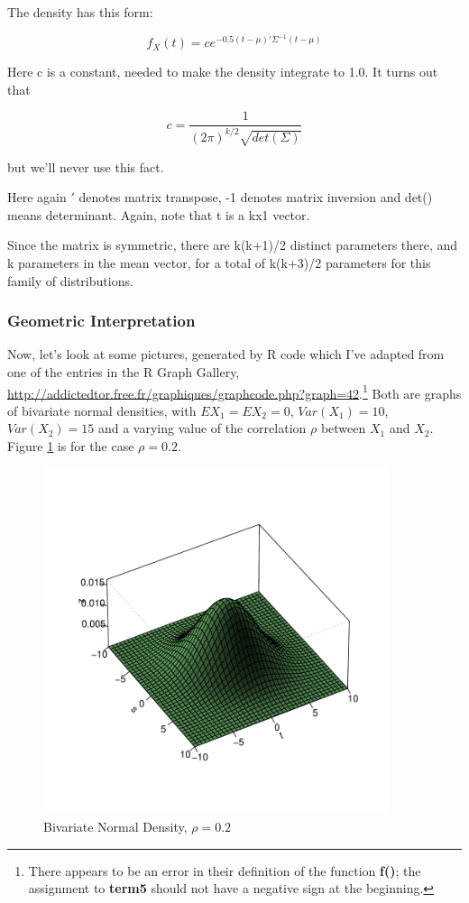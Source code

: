 The density has this form:

\begin{equation}
\label{bigbell}
f_X(t) = c e^{-0.5 (t-\mu)'\Sigma^{-1}(t-\mu)}
\end{equation}

Here c is a constant, needed to make the density integrate to 1.0.  It
turns out that 

\begin{equation}
c = \frac
{1}
{(2\pi)^{k/2} \sqrt{det(\Sigma)}}
\end{equation}

but we'll never use this fact.

Here again $'$ denotes matrix transpose, -1 denotes matrix inversion and det()
means determinant.  Again, note that t is a kx1 vector.  

Since the matrix is symmetric, there are k(k+1)/2 distinct parameters
there, and k parameters in the mean vector, for a total of k(k+3)/2
parameters for this family of distributions.

\subsubsection{Geometric Interpretation}

Now, let's look at some pictures, generated by R code which I've adapted
from one of the entries in the R Graph Gallery,
\url{http://addictedtor.free.fr/graphiques/graphcode.php?graph=42}.\footnote{There
appears to be an error in their definition of the function {\bf f()}; the
assignment to {\bf term5} should not have a negative sign at the
beginning.} Both are graphs of bivariate normal densities, with $EX_1 =
EX_2 = 0$, $Var(X_1) = 10$, $Var(X_2) = 15$ and a varying value of the
correlation $\rho$ between $X_1$ and $X_2$.  Figure \ref{rho2} is for
the case $\rho = 0.2$.


\begin{figure}
\centerline{
\includegraphics[width=4in]{Rho2.pdf}
}
\caption{Bivariate Normal Density, $\rho=0.2$}
\label{rho2}
\end{figure}

